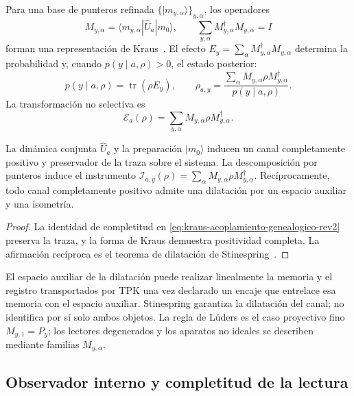 Para una base de punteros refinada
\(\{|m_{y,\alpha}\rangle\}_{y,\alpha}\), los operadores
\begin{equation}
 M_{y,\alpha}=\langle m_{y,\alpha}|\widehat U_a|m_0\rangle,
 \qquad
 \sum_{y,\alpha} M_{y,\alpha}^\dagger M_{y,\alpha}=I
 \label{eq:kraus-acoplamiento-genealogico-rev2}
\end{equation}
forman una representación de Kraus~\cite{Kraus1983}. El efecto
\(E_y=\sum_\alpha M_{y,\alpha}^\dagger M_{y,\alpha}\) determina la
probabilidad y, cuando \(p(y\mid a,\rho)>0\), el estado posterior:
\begin{equation}
 p(y\mid a,\rho)=\operatorname{tr}(\rho E_y),
 \qquad
 \rho_{a,y}
 =\frac{\sum_\alpha M_{y,\alpha}\rho M_{y,\alpha}^\dagger}
 {p(y\mid a,\rho)}.
 \label{eq:instrumento-kraus-genealogico-rev2}
\end{equation}
La transformación no selectiva es
\[
 \mathcal E_a(\rho)=
 \sum_{y,\alpha}M_{y,\alpha}\rho M_{y,\alpha}^\dagger.
\]

\begin{proposition}
\label{prop:acoplamiento-canal-reducido-rev2}
La dinámica conjunta \(\widehat U_a\) y la preparación \(|m_0\rangle\)
inducen un canal completamente positivo y preservador de la traza sobre el
sistema. La descomposición por punteros induce el instrumento
\(\mathcal I_{a,y}(\rho)=
\sum_\alpha M_{y,\alpha}\rho M_{y,\alpha}^\dagger\). Recíprocamente, todo canal
completamente positivo admite una dilatación por un espacio auxiliar y una
isometría.
\end{proposition}

\begin{proof}
La identidad de completitud en
\eqref{eq:kraus-acoplamiento-genealogico-rev2} preserva la traza, y la forma
de Kraus demuestra positividad completa. La afirmación recíproca es el
teorema de dilatación de Stinespring~\cite{Stinespring1955}.
\end{proof}

El espacio auxiliar de la dilatación puede realizar linealmente la memoria y
el registro transportados por TPK una vez declarado un encaje que entrelace
esa memoria con el espacio auxiliar. Stinespring garantiza la dilatación del
canal; no identifica por sí solo ambos objetos. La regla de Lüders es el caso
proyectivo fino \(M_{y,1}=P_y\); los lectores degenerados y los aparatos no
ideales se describen mediante familias \(M_{y,\alpha}\).

\subsection{Observador interno y completitud de la lectura}

